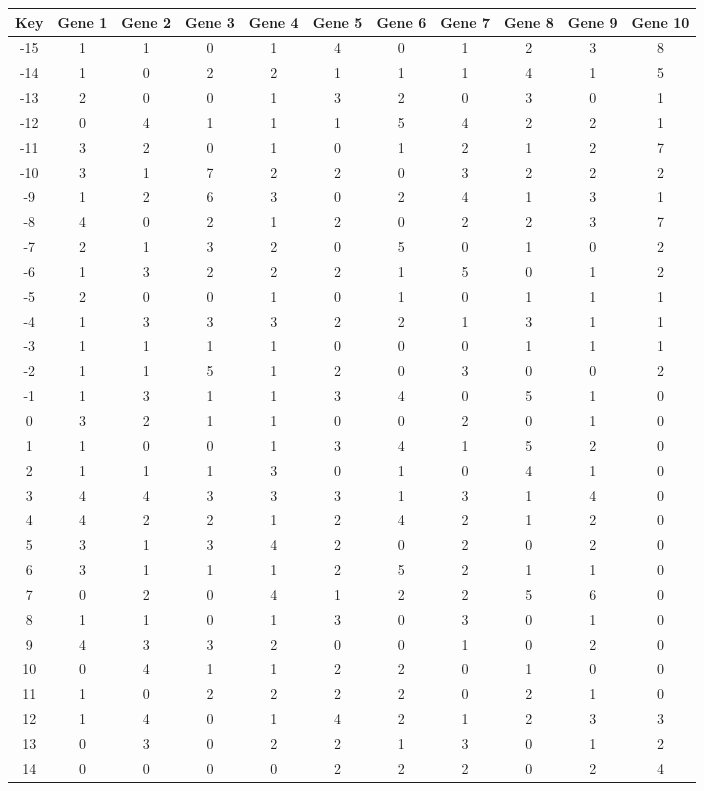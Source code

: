 \begin{tabular}{|c|c|c|c|c|c|c|c|c|c|c|}
\hline
Key & Gene 1 & Gene 2 & Gene 3 & Gene 4 & Gene 5 & Gene 6 & Gene 7 & Gene 8 & Gene 9 & Gene 10 \\
\hline
-15 & 1 & 1 & 0 & 1 & 4 & 0 & 1 & 2 & 3 & 8 \\
-14 & 1 & 0 & 2 & 2 & 1 & 1 & 1 & 4 & 1 & 5 \\
-13 & 2 & 0 & 0 & 1 & 3 & 2 & 0 & 3 & 0 & 1 \\
-12 & 0 & 4 & 1 & 1 & 1 & 5 & 4 & 2 & 2 & 1 \\
-11 & 3 & 2 & 0 & 1 & 0 & 1 & 2 & 1 & 2 & 7 \\
-10 & 3 & 1 & 7 & 2 & 2 & 0 & 3 & 2 & 2 & 2 \\
-9 & 1 & 2 & 6 & 3 & 0 & 2 & 4 & 1 & 3 & 1 \\
-8 & 4 & 0 & 2 & 1 & 2 & 0 & 2 & 2 & 3 & 7 \\
-7 & 2 & 1 & 3 & 2 & 0 & 5 & 0 & 1 & 0 & 2 \\
-6 & 1 & 3 & 2 & 2 & 2 & 1 & 5 & 0 & 1 & 2 \\
-5 & 2 & 0 & 0 & 1 & 0 & 1 & 0 & 1 & 1 & 1 \\
-4 & 1 & 3 & 3 & 3 & 2 & 2 & 1 & 3 & 1 & 1 \\
-3 & 1 & 1 & 1 & 1 & 0 & 0 & 0 & 1 & 1 & 1 \\
-2 & 1 & 1 & 5 & 1 & 2 & 0 & 3 & 0 & 0 & 2 \\
-1 & 1 & 3 & 1 & 1 & 3 & 4 & 0 & 5 & 1 & 0 \\
0 & 3 & 2 & 1 & 1 & 0 & 0 & 2 & 0 & 1 & 0 \\
1 & 1 & 0 & 0 & 1 & 3 & 4 & 1 & 5 & 2 & 0 \\
2 & 1 & 1 & 1 & 3 & 0 & 1 & 0 & 4 & 1 & 0 \\
3 & 4 & 4 & 3 & 3 & 3 & 1 & 3 & 1 & 4 & 0 \\
4 & 4 & 2 & 2 & 1 & 2 & 4 & 2 & 1 & 2 & 0 \\
5 & 3 & 1 & 3 & 4 & 2 & 0 & 2 & 0 & 2 & 0 \\
6 & 3 & 1 & 1 & 1 & 2 & 5 & 2 & 1 & 1 & 0 \\
7 & 0 & 2 & 0 & 4 & 1 & 2 & 2 & 5 & 6 & 0 \\
8 & 1 & 1 & 0 & 1 & 3 & 0 & 3 & 0 & 1 & 0 \\
9 & 4 & 3 & 3 & 2 & 0 & 0 & 1 & 0 & 2 & 0 \\
10 & 0 & 4 & 1 & 1 & 2 & 2 & 0 & 1 & 0 & 0 \\
11 & 1 & 0 & 2 & 2 & 2 & 2 & 0 & 2 & 1 & 0 \\
12 & 1 & 4 & 0 & 1 & 4 & 2 & 1 & 2 & 3 & 3 \\
13 & 0 & 3 & 0 & 2 & 2 & 1 & 3 & 0 & 1 & 2 \\
14 & 0 & 0 & 0 & 0 & 2 & 2 & 2 & 0 & 2 & 4 \\
\hline
\end{tabular}